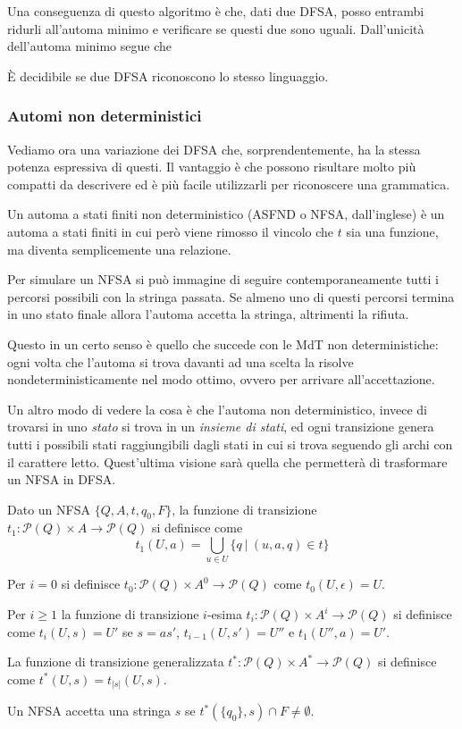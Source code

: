\documentclass[12pt]{article}
\numberwithin{theorem}{subsection}
\begin{document}
Una conseguenza di questo algoritmo è che, dati due DFSA, posso entrambi ridurli all'automa minimo e verificare se questi due sono uguali. Dall'unicità dell'automa minimo segue che 
\begin{corollary}
	È decidibile se due DFSA riconoscono lo stesso linguaggio.
\end{corollary}

\subsubsection{Automi non deterministici}
Vediamo ora una variazione dei DFSA che, sorprendentemente, ha la stessa potenza espressiva di questi. Il vantaggio è che possono risultare molto più compatti da descrivere ed è più facile utilizzarli per riconoscere una grammatica.
\begin{definition}
	Un automa a stati finiti non deterministico (ASFND o NFSA, dall'inglese) è un automa a stati finiti in cui però viene rimosso il vincolo che $t$ sia una funzione, ma diventa semplicemente una relazione.
\end{definition}

Per simulare un NFSA si può immagine di seguire contemporaneamente tutti i percorsi possibili con la stringa passata. Se almeno uno di questi percorsi termina in uno stato finale allora l'automa accetta la stringa, altrimenti la rifiuta.

Questo in un certo senso è quello che succede con le MdT non deterministiche: ogni volta che l'automa si trova davanti ad una scelta la risolve nondeterministicamente nel modo ottimo, ovvero per arrivare all'accettazione.

Un altro modo di vedere la cosa è che l'automa non deterministico, invece di trovarsi in uno \textit{stato} si trova in un \textit{insieme di stati}, ed ogni transizione genera tutti i possibili stati raggiungibili dagli stati in cui si trova seguendo gli archi con il carattere letto. Quest'ultima visione sarà quella che permetterà di trasformare un NFSA in DFSA.

\begin{definition}
	Dato un NFSA $\{ Q, A, t, q_0, F \}$, la funzione di transizione $t_1 : \mathcal{P}(Q) \times A \rightarrow \mathcal{P}(Q)$ si definisce come
	\[
	t_1(U, a) = \bigcup\limits_{u \in U} \{ q \ \vert \ (u, a, q) \in t \}
	\]
	
	Per $i = 0$ si definisce $t_0 : \mathcal{P}(Q) \times A^0 \rightarrow \mathcal{P}(Q)$ come $t_0(U, \epsilon) = U$.
	
	Per $i \ge 1$ la funzione di transizione $i$-esima $t_i : \mathcal{P}(Q) \times A^i \rightarrow \mathcal{P}(Q)$ si definisce come $t_i(U, s) = U'$ se $s = as'$, $t_{i-1}(U, s') = U''$ e $t_1(U'', a) = U'$.
	
	La funzione di transizione generalizzata $t^*: \mathcal{P}(Q) \times A^* \rightarrow \mathcal{P}(Q)$ si definisce come $t^*(U, s) = t_{\vert s \vert}(U, s)$.
	
	Un NFSA accetta una stringa $s$ se $t^*(\{ q_0 \}, s) \cap F \neq \emptyset$.
\end{definition}
\end{document}
